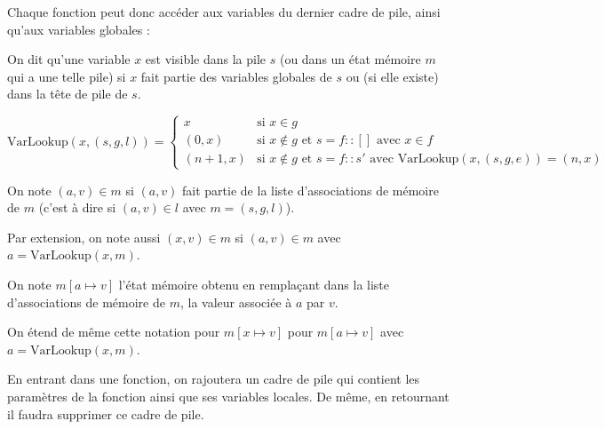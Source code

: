 Chaque fonction peut donc accéder aux variables du dernier cadre de pile, ainsi
qu'aux variables globales :

\begin{definition}[Visibilité]
  On dit qu'une variable $x$ est visible dans la pile $s$ (ou dans un état
  mémoire $m$ qui a une telle pile) si $x$ fait partie des variables globales de
  $s$ ou (si elle existe) dans la tête de pile de $s$.
\end{definition}

\begin{definition}

  \[
    \textrm{VarLookup} (x, (s, g, l)) =
      \begin{cases}
        x      & \mbox{si } x ∈ g \\
      (0, x)   & \mbox{si } x ∉ g \mbox{ et } s = f::[]
                 \mbox{ avec } x ∈ f \\
      (n+1, x) & \mbox{si } x ∉ g \mbox{ et } s = f::s'
                 \mbox{ avec } \textrm{VarLookup} (x, (s, g, e)) = (n, x)
      \end{cases}
  \]

\end{definition}

\begin{definition}

  On note $(a, v) ∈ m$ si $(a, v)$ fait partie de la liste d'associations de
  mémoire de $m$ (c'est à dire si $(a, v) ∈ l$ avec $m = (s, g, l)$).

  Par extension, on note aussi $(x, v) ∈ m$ si $(a, v) ∈ m$ avec $a =
  \textrm{VarLookup}(x, m)$.

  On note $m[a ↦ v]$ l'état mémoire obtenu en remplaçant dans la liste
  d'associations de mémoire de $m$, la valeur associée à $a$ par $v$.

  On étend de même cette notation pour $m[x ↦ v]$ pour $m[a ↦ v]$ avec
  $a = \textrm{VarLookup}(x, m)$.

\end{definition}

En entrant dans une fonction, on rajoutera un cadre de pile qui contient les
paramètres de la fonction ainsi que ses variables locales. De même, en
retournant il faudra supprimer ce cadre de pile.

